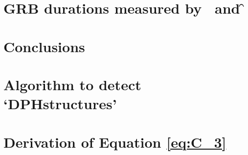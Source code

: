 \documentclass[12pt, %
english, %
singlespacing, %
2%
headsepline, %
]{MastersDoctoralThesis} %
\begin{document}
\chapter{GRB durations measured by \s\ and \f}
\label{chap:ongoing}


\chapter{Conclusions}
\label{chap:conclusions}






\appendix

\chapter[Algorithm to detect `DPHstructures']{Algorithm to detect `DPHstructures'}
\label{appendix:DPHstructures}


\chapter[Derivation of Equation \ref{eq:C_3}]{Derivation of Equation \ref{eq:C_3}}
\label{appendix:derivation_of_C3}





\cleardoublepage
{}
{}


\end{document}

